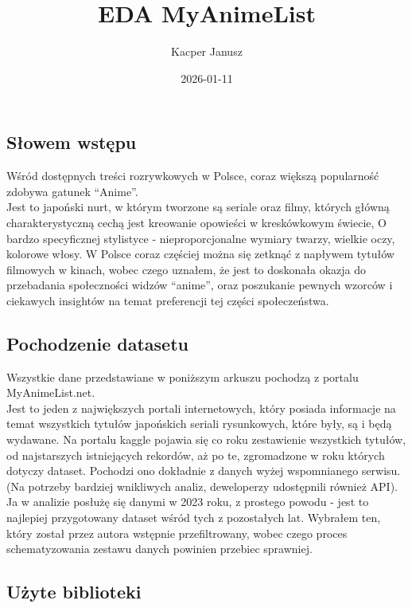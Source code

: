 \documentclass[
]{article}
\title{EDA MyAnimeList}
\author{Kacper Janusz}
\date{2026-01-11}
\begin{document}
\maketitle

\subsection{Słowem wstępu}\label{sux142owem-wstux119pu}

Wśród dostępnych treści rozrywkowych w Polsce, coraz większą popularność
zdobywa gatunek ``Anime''.\\
Jest to japoński nurt, w którym tworzone są seriale oraz filmy, których
główną charakterystyczną cechą jest kreowanie opowieści w kreskówkowym
świecie, O bardzo specyficznej stylistyce - nieproporcjonalne wymiary
twarzy, wielkie oczy, kolorowe włosy. W Polsce coraz częściej można się
zetknąć z napływem tytułów filmowych w kinach, wobec czego uznałem, że
jest to doskonała okazja do przebadania społeczności widzów ``anime'',
oraz poszukanie pewnych wzorców i ciekawych insightów na temat
preferencji tej części społeczeństwa.

\subsection{Pochodzenie datasetu}\label{pochodzenie-datasetu}

Wszystkie dane przedstawiane w poniższym arkuszu pochodzą z portalu
MyAnimeList.net.\\
Jest to jeden z największych portali internetowych, który posiada
informacje na temat wszystkich tytułów japońskich seriali rysunkowych,
które były, są i będą wydawane. Na portalu kaggle pojawia się co roku
zestawienie wszystkich tytułów, od najstarszych istniejących rekordów,
aż po te, zgromadzone w roku których dotyczy dataset. Pochodzi ono
dokładnie z danych wyżej wspomnianego serwisu. (Na potrzeby bardziej
wnikliwych analiz, deweloperzy udostępnili również API). Ja w analizie
posłużę się danymi w 2023 roku, z prostego powodu - jest to najlepiej
przygotowany dataset wśród tych z pozostałych lat. Wybrałem ten, który
został przez autora wstępnie przefiltrowany, wobec czego proces
schematyzowania zestawu danych powinien przebiec sprawniej.

\subsection{Użyte biblioteki}\label{uux17cyte-biblioteki}
\end{document}
